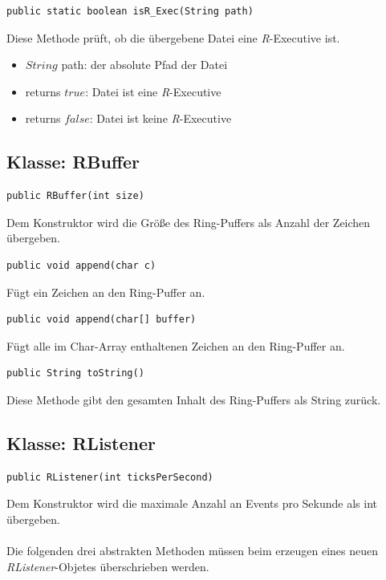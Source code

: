 \documentclass[a4paper, 12pt]{report} %
\begin{document}
\lstset{language=Java}
\begin{lstlisting}[frame=single]
public static boolean isR_Exec(String path)
\end{lstlisting}
Diese Methode prüft, ob die übergebene Datei eine \textit{R}-Executive ist.
\begin{itemize}
	\item $String$ path: der absolute Pfad der Datei
	\item returns $true$: Datei ist eine \textit{R}-Executive
	\item returns $false$: Datei ist keine \textit{R}-Executive
\end{itemize}

\subsection{Klasse: RBuffer}

\lstset{language=Java}
\begin{lstlisting}[frame=single]
public RBuffer(int size)
\end{lstlisting}
Dem Konstruktor wird die Größe des Ring-Puffers als Anzahl der Zeichen übergeben.\\

\lstset{language=Java}
\begin{lstlisting}[frame=single]
public void append(char c)
\end{lstlisting}
Fügt ein Zeichen an den Ring-Puffer an.\\

\lstset{language=Java}
\begin{lstlisting}[frame=single]
public void append(char[] buffer)
\end{lstlisting}
Fügt alle im Char-Array enthaltenen Zeichen an den Ring-Puffer an.\\

\lstset{language=Java}
\begin{lstlisting}[frame=single]
public String toString()
\end{lstlisting}
Diese Methode gibt den gesamten Inhalt des Ring-Puffers als String zurück.

\subsection{Klasse: RListener}

\lstset{language=Java}
\begin{lstlisting}[frame=single]
public RListener(int ticksPerSecond)
\end{lstlisting}
Dem Konstruktor wird die maximale Anzahl an Events pro Sekunde als int übergeben.\\
\\
Die folgenden drei abstrakten Methoden müssen beim erzeugen eines neuen \textit{RListener}-Objetes überschrieben werden.
\end{document}
